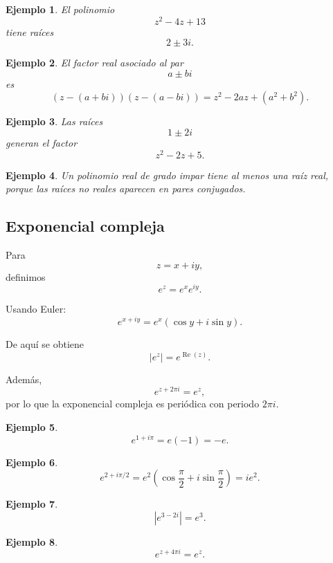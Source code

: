 \documentclass[12pt]{article}
\newtheorem{Ejem}{Ejemplo}
\begin{document}
\begin{Ejem}
El polinomio
\[
z^2-4z+13
\]
tiene raíces
\[
2\pm3i.
\]

\end{Ejem}


\begin{Ejem}
El factor real asociado al par
\[
a\pm bi
\]
es
\[
(z-(a+bi))(z-(a-bi))=z^2-2az+(a^2+b^2).
\]

\end{Ejem}


\begin{Ejem}

Las raíces
\[
1\pm2i
\]
generan el factor
\[
z^2-2z+5.
\]

\end{Ejem}


\begin{Ejem}
Un polinomio real de grado impar tiene al menos una raíz real, porque las
raíces no reales aparecen en pares conjugados.
\end{Ejem}


\subsection*{Exponencial compleja}

Para
\[
z=x+iy,
\]
definimos
\[
e^z
=
e^x e^{iy}.
\]

Usando Euler:
\[
\boxed{
e^{x+iy}
=
e^x(\cos y+i\sin y).
}
\]

De aquí se obtiene
\[
\boxed{|e^z|=e^{\operatorname{Re}(z)}.}
\]

Además,
\[
e^{z+2\pi i}=e^z,
\]
por lo que la exponencial compleja es periódica con periodo $2\pi i$.

\begin{Ejem}

\[
e^{1+i\pi}
=
e(-1)
=
-e.
\]
\end{Ejem}


\begin{Ejem}
\[
e^{2+i\pi/2}
=
e^2\left(\cos\frac{\pi}{2}+i\sin\frac{\pi}{2}\right)
=
ie^2.
\]

\end{Ejem}


\begin{Ejem}
\[
|e^{3-2i}|=e^3.
\]
\end{Ejem}


\begin{Ejem}
\[
e^{z+4\pi i}=e^z.
\]
\end{Ejem}
\end{document}
